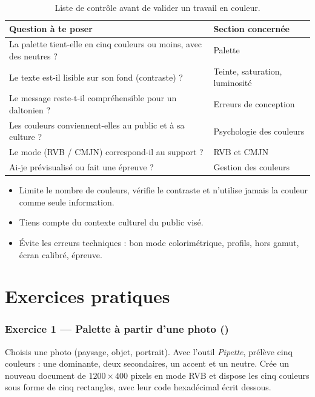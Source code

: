 \begin{table}[h!]
\centering
\begin{tabular}{@{}p{9cm}p{5cm}@{}}
\toprule
\textbf{Question à te poser} & \textbf{Section concernée} \\
\midrule
La palette tient-elle en cinq couleurs ou moins, avec des neutres ? & Palette \\
Le texte est-il lisible sur son fond (contraste) ? & Teinte, saturation, luminosité \\
Le message reste-t-il compréhensible pour un daltonien ? & Erreurs de conception \\
Les couleurs conviennent-elles au public et à sa culture ? & Psychologie des couleurs \\
Le mode (RVB / CMJN) correspond-il au support ? & RVB et CMJN \\
Ai-je prévisualisé ou fait une épreuve ? & Gestion des couleurs \\
\bottomrule
\end{tabular}
\caption{Liste de contrôle avant de valider un travail en couleur.}
\end{table}

\begin{retenir}
\begin{itemize}
  \item Limite le nombre de couleurs, vérifie le contraste et n'utilise jamais la couleur comme seule information.
  \item Tiens compte du contexte culturel du public visé.
  \item Évite les erreurs techniques : bon mode colorimétrique, profils, hors gamut, écran calibré, épreuve.
\end{itemize}
\end{retenir}

\section*{Exercices pratiques}

\subsubsection*{Exercice 1 --- Palette à partir d'une photo ()}

Choisis une photo (paysage, objet, portrait). Avec l'outil \emph{Pipette}, prélève cinq couleurs : une dominante, deux secondaires, un accent et un neutre. Crée un nouveau document de $1200 \times 400$ pixels en mode RVB et dispose les cinq couleurs sous forme de cinq rectangles, avec leur code hexadécimal écrit dessous.

